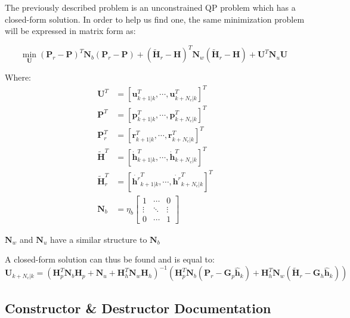 The previously described problem is an unconstrained QP problem which has a closed-\/form solution. In order to help us find one, the same minimization problem will be expressed in matrix form as\+:

\[ \underset{\mathbf{U}}{\text{min}} \; (\mathbf{P}_r - \mathbf{P})^T \mathbf{N}_b (\mathbf{P}_r - \mathbf{P}) + (\tilde{\mathbf{H}}_r - \mathbf{H})^T\mathbf{N}_w(\tilde{\mathbf{H}}_r - \mathbf{H}) + \mathbf{U}^T\mathbf{N}_u \mathbf{U} \]

Where\+: \begin{align*} \mathbf{U}^T &= \left[ \mathbf{u}^T_{k+1|k}, \cdots, \mathbf{u}^T_{k+N_c|k} \right]^T \\ \mathbf{P}^T &= \left[ \mathbf{p}^T_{k+1|k}, \cdots, \mathbf{p}^T_{k+N_c|k} \right]^T \\ \mathbf{P}^T_r &= \left[ \mathbf{r}^T_{k+1|k}, \cdots, \mathbf{r}^T_{k+N_c|k} \right]^T \\ \mathbf{\tilde{H}}^T &= \left[ \dot{\mathbf{h}}^T_{k+1|k}, \cdots, \dot{\mathbf{h}}^T_{k+N_c|k} \right]^T \\ \mathbf{\tilde{H}}^T_r &= \left[ \dot{\mathbf{h}^r}^T_{k+1|k}, \cdots, \dot{\mathbf{h}^r}^T_{k+N_c|k} \right]^T \\ \mathbf{N}_b &= \eta_b\left[\begin{array}{ccc} 1 & \cdots & 0 \\ \vdots & \ddots & \vdots\\ 0 & \cdots & 1 \end{array}\right] \end{align*}

$\mathbf{N}_w$ and $\mathbf{N}_u$ have a similar structure to $\mathbf{N}_b$

A closed-\/form solution can thus be found and is equal to\+: \[ \mathbf{U}_{k+N_c|k} = (\mathbf{H}_p^T \mathbf{N}_b \mathbf{H}_p + \mathbf{N}_u + \mathbf{H}_h^T \mathbf{N}_w \mathbf{H}_h)^{-1} \left(\mathbf{H}^T_p \mathbf{N}_b (\mathbf{P}_r - \mathbf{G}_p \hat{\mathbf{h}}_k) + \mathbf{H}^T_h\mathbf{N}_w(\tilde{\mathbf{H}}_r - \mathbf{G}_h \hat{\mathbf{h}}_k)\right) \] 

\subsection{Constructor \& Destructor Documentation}
\hypertarget{classZmpPreviewController_a26b5bd0bdd476f70c2009d77d5495b24}{}\label{classZmpPreviewController_a26b5bd0bdd476f70c2009d77d5495b24} 

